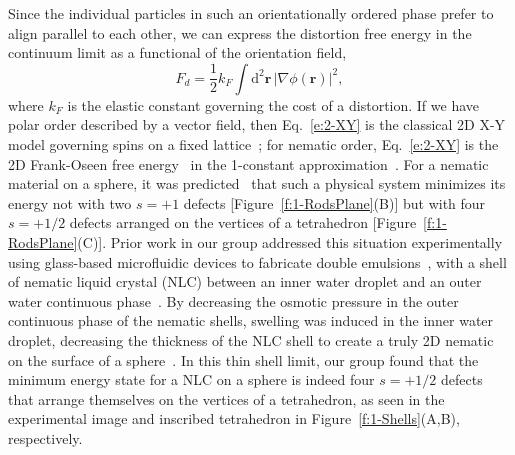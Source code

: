 Since the individual particles in such an orientationally ordered phase prefer to align parallel to each other, we can express the distortion free energy in the continuum limit as a functional of the orientation field,
\begin{equation}
  F_d = \frac{1}{2} k_F \int \textrm{d}^2\mathbf{r} \, |\nabla \phi(\mathbf{r})|^2,\label{e:2-XY}
\end{equation}
where $k_F$ is the elastic constant governing the cost of a distortion.
If we have polar order described by a vector field, then Eq.~\ref{e:2-XY} is the classical 2D X-Y model governing spins on a fixed lattice~\cite{RN175}; for nematic order, Eq.~\ref{e:2-XY} is the 2D Frank-Oseen free energy~\cite{RN61} in the 1-constant approximation~\cite{RN33}.
For a nematic material on a sphere, it was predicted~\cite{RN42,RN104,RN43} that such a physical system minimizes its energy not with two $s=+1$ defects [Figure~\ref{f:1-RodsPlane}(B)] but with four $s=+1/2$ defects arranged on the vertices of a tetrahedron [Figure~\ref{f:1-RodsPlane}(C)].
Prior work in our group addressed this situation experimentally using glass-based microfluidic devices to fabricate double emulsions~\cite{RN272}, with a shell of nematic liquid crystal (NLC) between an inner water droplet and an outer water continuous phase~\cite{RN105,RN45}.
By decreasing the osmotic pressure in the outer continuous phase of the nematic shells, swelling was induced in the inner water droplet, decreasing the thickness of the NLC shell to create a truly 2D nematic on the surface of a sphere~\cite{RN45}.
In this thin shell limit, our group found that the minimum energy state for a NLC on a sphere is indeed four $s = +1/2$ defects that arrange themselves on the vertices of a tetrahedron, as seen in the experimental image and inscribed tetrahedron in Figure~\ref{f:1-Shells}(A,B), respectively.

